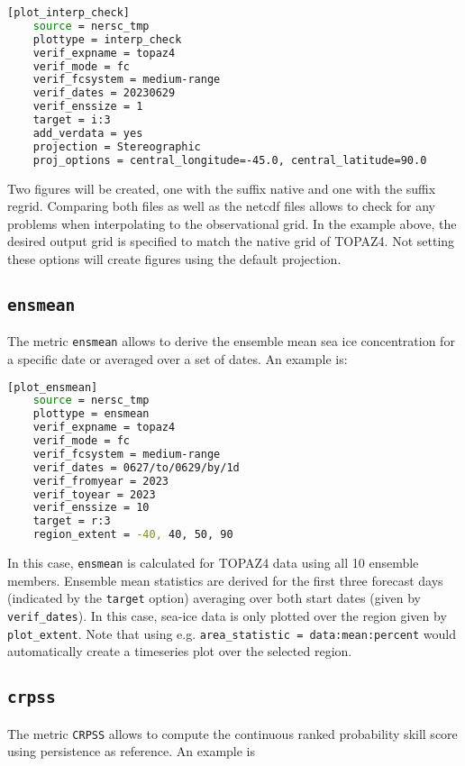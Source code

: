 \documentclass[DIV=10, parskip=full]{scrreprt}
\begin{document}
\begin{lstlisting}[language=bash]
	[plot_interp_check]
	source = nersc_tmp
	plottype = interp_check
	verif_expname = topaz4
	verif_mode = fc
	verif_fcsystem = medium-range
	verif_dates = 20230629
	verif_enssize = 1
	target = i:3
	add_verdata = yes
	projection = Stereographic
	proj_options = central_longitude=-45.0, central_latitude=90.0
\end{lstlisting}

Two figures will be created, one with the suffix native and one with the suffix regrid. Comparing both files as well as the netcdf files allows to check for any problems when interpolating to the observational grid. In the example above, the desired output grid is specified to match the native grid of TOPAZ4. Not setting these options will create figures using the default projection.   

\subsection{\texttt{ensmean}}
The metric \texttt{ensmean} allows to derive the ensemble mean sea ice concentration for a specific date or averaged over a set of dates. An example is:

\begin{lstlisting}[language=bash]
	[plot_ensmean]
	source = nersc_tmp
	plottype = ensmean
	verif_expname = topaz4
	verif_mode = fc
	verif_fcsystem = medium-range
	verif_dates = 0627/to/0629/by/1d
	verif_fromyear = 2023
	verif_toyear = 2023
	verif_enssize = 10
	target = r:3
	region_extent = -40, 40, 50, 90
\end{lstlisting}

In this case, \texttt{ensmean} is calculated for TOPAZ4 data using all 10 ensemble members. Ensemble mean statistics are derived for the first three forecast days (indicated by the \texttt{target} option) averaging over both start dates (given by \texttt{verif\_dates}). In this case, sea-ice data is only plotted over the region given by \texttt{plot\_extent}. Note that using e.g. \texttt{area\_statistic = data:mean:percent} would automatically create a timeseries plot over the selected region.

\subsection{\texttt{crpss}}
The metric \texttt{CRPSS} allows to compute the continuous ranked probability skill score using persistence as reference. An example is
\end{document}
